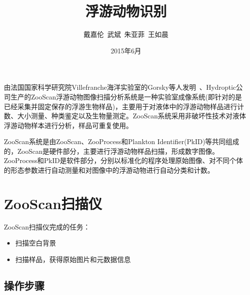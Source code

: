 \documentclass[12pt]{article}
\begin{document}
\title{\vspace{-2em}浮游动物识别\vspace{-0.7em}}
\author{戴嘉伦\ 武斌\ 朱亚菲\ 王如晨}
\date{\vspace{-0.7em}2015年6月\vspace{-0.7em}}
\maketitle\thispagestyle{fancy}
\maketitle
\tableofcontents 

由法国国家科学研究院Villefranche海洋实验室的Gorsky等人发明~\cite{gorsky2003qualitative}、Hydroptic公司生产的ZooScan浮游动物图像扫描分析系统是一种实验室成像系统(即针对的是已经采集并固定保存的浮游生物样品)，主要用于对液体中的浮游动物样品进行计数、大小测量、种类鉴定以及生物量测定。ZooScan系统采用非破坏性技术对液体浮游动物样本进行分析，样品可重复使用。

ZooScan系统是由ZooScan、ZooProcess和Plankton Identifier(PkID)等共同组成的，ZooScan是硬件部分，主要进行浮游动物样品扫描，形成数字图像。ZooProcess和PkID是软件部分，分别以标准化的程序处理原始图像、对不同个体的形态参数进行自动测量和对图像中的浮游动物进行自动分类和计数。

\section{ZooScan扫描仪}

ZooScan扫描仪完成的任务：
\begin{itemize}
\item 扫描空白背景
\item 扫描样品，获得原始图片和元数据信息
\end{itemize}

\subsection{操作步骤}
\end{document}
